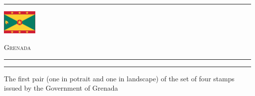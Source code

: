\documentclass[a4paper]{article}
\begin{document}
\hrule
\vspace{8pt}
\begin{minipage}{2cm}
  \includegraphics[height=1.2cm]{images/gd}
\end{minipage}
\hfill
{\scshape\huge Grenada}
\vspace{8pt}
\hrule
\vspace{21cm}
\begin{center}
  \begin{minipage}{10cm}
    \hrule \vspace{12pt} The first pair (one in potrait and one in
    landscape) of the set of four stamps issued by the Government of
    Grenada
  \end{minipage}
\end{center}
\end{document}
